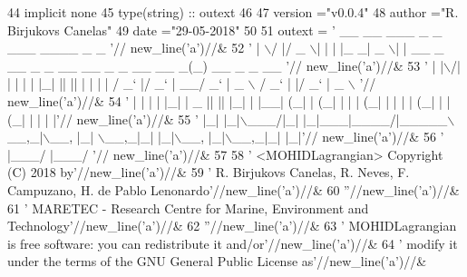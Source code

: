 \begin{DoxyCode}
44     \textcolor{keywordtype}{implicit none}
45     \textcolor{keywordtype}{type}(string) :: outext
46 
47     version  =\textcolor{stringliteral}{"v0.0.4"}
48     author   =\textcolor{stringliteral}{"R. Birjukovs Canelas"}
49     date     =\textcolor{stringliteral}{"29-05-2018"}
50 
51     outext = \textcolor{stringliteral}{' \_\_  \_\_  \_\_\_  \_   \_ \_\_\_ \_\_\_\_  \_                                      \_             '}//
      new\_line(\textcolor{stringliteral}{'a'})//&
52              \textcolor{stringliteral}{' |  \(\backslash\)/  |/ \_ \(\backslash\)| | | |\_ \_|  \_ \(\backslash\)| |    \_\_ \_  \_\_ \_ \_ \_\_ \_\_ \_ \_ \_\_   \_\_ \_(\_) \_\_ \_ \_ \_\_  '}//
      new\_line(\textcolor{stringliteral}{'a'})//&
53              \textcolor{stringliteral}{' | |\(\backslash\)/| | | | | |\_| || || | | | |   / \_` |/ \_` | \_\_/  \_` |  \_ \(\backslash\) / \_` | |/ \_` |  \_ \(\backslash\) '}//
      new\_line(\textcolor{stringliteral}{'a'})//&
54              \textcolor{stringliteral}{' | |  | | |\_| |  \_  || || |\_| | |\_\_| (\_| | (\_| | | | (\_| | | | | (\_| | | (\_| | | | |'}//
      new\_line(\textcolor{stringliteral}{'a'})//&
55              \textcolor{stringliteral}{' |\_|  |\_|\(\backslash\)\_\_\_/|\_| |\_|\_\_\_|\_\_\_\_/|\_\_\_\_\_\(\backslash\)\_\_,\_|\(\backslash\)\_\_, |\_|  \(\backslash\)\_\_,\_|\_| |\_|\(\backslash\)\_\_, |\_|\(\backslash\)\_\_,\_|\_| |\_|'}//
      new\_line(\textcolor{stringliteral}{'a'})//&
56              \textcolor{stringliteral}{'                                          |\_\_\_/                 |\_\_\_/               '}//
      new\_line(\textcolor{stringliteral}{'a'})//&
57 
58         \textcolor{stringliteral}{'  <MOHIDLagrangian> Copyright (C) 2018 by'}//new\_line(\textcolor{stringliteral}{'a'})//&
59         \textcolor{stringliteral}{'  R. Birjukovs Canelas, R. Neves, F. Campuzano, H. de Pablo Lenonardo'}//new\_line(\textcolor{stringliteral}{'a'})//&
60         \textcolor{stringliteral}{''}//new\_line(\textcolor{stringliteral}{'a'})//&
61         \textcolor{stringliteral}{'  MARETEC - Research Centre for Marine, Environment and Technology'}//new\_line(\textcolor{stringliteral}{'a'})//&
62         \textcolor{stringliteral}{''}//new\_line(\textcolor{stringliteral}{'a'})//&
63         \textcolor{stringliteral}{'  MOHIDLagrangian is free software: you can redistribute it and/or'}//new\_line(\textcolor{stringliteral}{'a'})//&
64         \textcolor{stringliteral}{'  modify it under the terms of the GNU General Public License as'}//new\_line(\textcolor{stringliteral}{'a'})//&

\end{DoxyCode}
